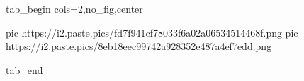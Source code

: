  
 
 
 
 


\ifcmt
  tab_begin cols=2,no_fig,center

     pic https://i2.paste.pics/fd7f941cf78033f6a02a06534514468f.png
		 pic https://i2.paste.pics/8eb18eec99742a928352e487a4ef7edd.png

  tab_end
\fi
